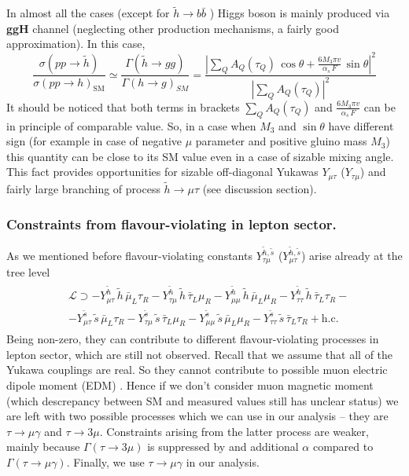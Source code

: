\documentclass[10pt]{article}
\begin{document}
\noindent
In almost all the cases (except for $\tilde{h} \rightarrow b \bar{b}$ \cite{CMS_bb_1,CMS_bb_2,CMS_bb_tau,ATLAS_bb}) Higgs boson is mainly produced via \textbf{ggH} channel (neglecting other production mechanisms, a fairly good approximation). In this case,
\begin{equation}
\label{ggH}
\frac{\sigma(pp \rightarrow \tilde{h})}{\sigma (pp \rightarrow h)_{\text{SM}}} \simeq \frac{\Gamma(\tilde{h} \rightarrow gg)}{\Gamma(h \rightarrow g)_{SM}} = \frac{\left \vert \sum_{Q} A_{Q}(\tau_Q) \, \cos \theta + \frac{6 M_3 \pi v}{\alpha_s \, F} \, \sin \theta \right \vert^2}{\left \vert \sum_{Q} A_{Q}(\tau_Q)  \right \vert^2}
\end{equation}
It should be noticed that both terms in brackets $\sum_{Q} A_{Q}(\tau_Q)$ and $\frac{6 M_3 \pi v}{\alpha_s \, F}$ can be in principle of comparable value. So, in a case when $M_3$ and $\sin \theta$ have different sign (for example in case of negative $\mu$ parameter and positive gluino mass $M_3$) this quantity can be close to its SM value even in a case of sizable mixing angle. This fact provides opportunities for sizable off-diagonal Yukawas $Y_{\mu \tau}$ ($Y_{\tau \mu }$) and fairly large branching of process $\tilde{h} \rightarrow \mu \tau$ (see discussion section). 
\subsubsection{Constraints from flavour-violating in lepton sector.}
\noindent
As we mentioned before flavour-violating constants $Y^{\tilde{h},\tilde{s}}_{\tau \mu}$ ($Y_{\mu \tau}^{\tilde{h},\tilde{s}}$) arise already at the tree level
\begin{eqnarray}
\label{LFVLagr}
\begin{aligned}
& \mathcal{L} \supset - Y_{\mu \tau}^{\tilde{h}} \, \tilde{h} \, \bar{\mu}_L \tau_R - Y_{\tau \mu}^{\tilde{h}} \, \tilde{h} \, \bar{\tau}_L \mu_R - Y_{\mu \mu}^{\tilde{h}} \, \tilde{h} \, \bar{\mu}_L \mu_R -Y_{\tau \tau}^{\tilde{h}} \, \tilde{h} \, \bar{\tau}_L \tau_R - \\
& - Y_{\mu \tau}^{\tilde{s}} \, \tilde{s} \, \bar{\mu}_L \tau_R - Y_{\tau \mu}^{\tilde{s}} \, \tilde{s} \, \bar{\tau}_L \mu_R - Y_{\mu \mu}^{\tilde{s}} \, \tilde{s} \, \bar{\mu}_L \mu_R -Y_{\tau \tau}^{\tilde{s}} \, \tilde{s} \, \bar{\tau}_L \tau_R  + \text{h.c.}
\end{aligned}
\end{eqnarray}
Being non-zero, they can contribute to different flavour-violating processes in lepton sector, which are still not observed. Recall that we assume that all of the Yukawa couplings are real. So they cannot contribute to possible muon electric dipole moment (EDM) \cite{Harnik}. Hence if we don't consider muon magnetic moment (which descrepancy between SM and measured values still has unclear status) we are left with two possible processes which we can use in our analysis -- they are $\tau \rightarrow \mu \gamma$ and $\tau \rightarrow 3\mu$. Constraints arising from the latter process are weaker, mainly because $\Gamma(\tau \rightarrow 3 \mu)$ is suppressed by and additional $\alpha$ compared to $\Gamma(\tau \rightarrow \mu \gamma)$. Finally, we use $\tau \rightarrow \mu \gamma$ in our analysis.
\end{document}
